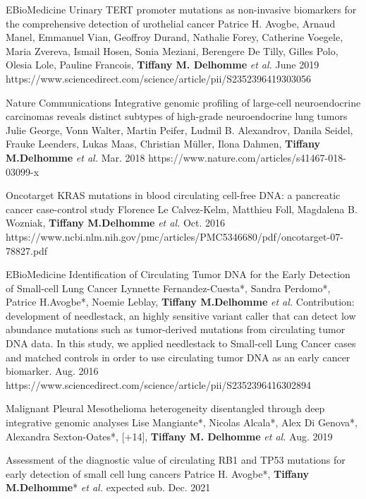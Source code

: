 \begin{cventries}
  \cvpublicationentry
    {EBioMedicine} %
    {Urinary TERT promoter mutations as non-invasive biomarkers for the comprehensive detection of urothelial cancer} %
    {Patrice H. Avogbe, Arnaud Manel, Emmanuel Vian, Geoffroy Durand, Nathalie Forey, Catherine Voegele, Maria Zvereva, Ismail Hosen, Sonia Meziani, Berengere De Tilly, Gilles Polo, Olesia Lole, Pauline Francois, \textbf{Tiffany M. Delhomme} \textit{et al.}} %
    {}
    {June 2019} %
    {https://www.sciencedirect.com/science/article/pii/S2352396419303056}

  \cvpublicationentry
    {Nature Communications} %
    {Integrative genomic profiling of large-cell neuroendocrine carcinomas reveals distinct subtypes of high-grade neuroendocrine lung tumors} %
    {Julie George, Vonn Walter, Martin Peifer, Ludmil B. Alexandrov, Danila Seidel, Frauke Leenders, Lukas Maas, Christian Müller, Ilona Dahmen, \textbf{Tiffany M.Delhomme} \textit{et al.}} %
    {}
    {Mar. 2018} %
    {https://www.nature.com/articles/s41467-018-03099-x}

  \cvpublicationentry
    {Oncotarget} %
    {KRAS mutations in blood circulating cell-free DNA: a pancreatic
cancer case-control study} %
    {Florence Le Calvez-Kelm, Matthieu Foll, Magdalena B. Wozniak, \textbf{Tiffany M.Delhomme} \textit{et al.}} %
    {}
    {Oct. 2016} %
    {https://www.ncbi.nlm.nih.gov/pmc/articles/PMC5346680/pdf/oncotarget-07-78827.pdf}

 
  \cvpublicationentry
    {EBioMedicine} %
    {Identification of Circulating Tumor DNA for the Early Detection of Small-cell Lung Cancer} %
    {Lynnette Fernandez-Cuesta*, Sandra Perdomo*, Patrice H.Avogbe*, Noemie Leblay, \textbf{Tiffany M.Delhomme} \textit{et al.}} %
    {Contribution: development of needlestack, an highly sensitive variant caller that can detect low abundance mutations such as tumor-derived mutations from circulating tumor DNA data. In this study, we applied needlestack to Small-cell Lung Cancer cases and matched controls in order to use circulating tumor DNA as an early cancer biomarker.}
    {Aug. 2016} %
    {https://www.sciencedirect.com/science/article/pii/S2352396416302894}


 
     \cvpublicationentry
    {} %
    {Malignant Pleural Mesothelioma heterogeneity disentangled through deep integrative
genomic analyses} %
    {Lise Mangiante*, Nicolas Alcala*, Alex Di Genova*, Alexandra Sexton-Oates*, [+14], \textbf{Tiffany M. Delhomme} \textit{et al.}} %
    {}
    {Aug. 2019} %
    {}     
    

    \cvpublicationentry
    {} %
    {Assessment of the diagnostic value of circulating RB1 and
TP53 mutations for early detection of small cell lung cancers} %
    {Patrice H. Avogbe*, \textbf{Tiffany M.Delhomme}* \textit{et al.}} %
    {}
    {expected sub. Dec. 2021} %
    {}
\end{cventries}
